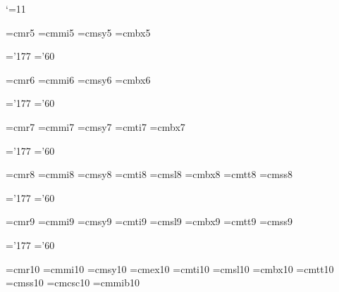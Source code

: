 \catcode`\@=11					%



\font\fiverm=cmr5				%
\font\fivemi=cmmi5				%
\font\fivesy=cmsy5				%
\font\fivebf=cmbx5				%

\skewchar\fivemi='177
\skewchar\fivesy='60


\font\sixrm=cmr6				%
\font\sixi=cmmi6				%
\font\sixsy=cmsy6				%
\font\sixbf=cmbx6				%

\skewchar\sixi='177
\skewchar\sixsy='60


\font\sevenrm=cmr7				%
\font\seveni=cmmi7				%
\font\sevensy=cmsy7				%
\font\sevenit=cmti7				%
\font\sevenbf=cmbx7				%

\skewchar\seveni='177
\skewchar\sevensy='60


\font\eightrm=cmr8				%
\font\eighti=cmmi8				%
\font\eightsy=cmsy8				%
\font\eightit=cmti8				%
\font\eightsl=cmsl8				%
\font\eightbf=cmbx8				%
\font\eighttt=cmtt8				%
\font\eightss=cmss8				%

\skewchar\eighti='177
\skewchar\eightsy='60


\font\ninerm=cmr9
\font\ninei=cmmi9
\font\ninesy=cmsy9
\font\nineit=cmti9
\font\ninesl=cmsl9
\font\ninebf=cmbx9
\font\ninett=cmtt9
\font\niness=cmss9

\skewchar\ninei='177
\skewchar\ninesy='60


\font\tenrm=cmr10				%
\font\teni=cmmi10				%
\font\tensy=cmsy10				%
\font\tenex=cmex10				%
\font\tenit=cmti10				%
\font\tensl=cmsl10				%
\font\tenbf=cmbx10				%
\font\tentt=cmtt10				%
\font\tenss=cmss10				%
\font\tensc=cmcsc10				%
\font\tenbi=cmmib10				%

